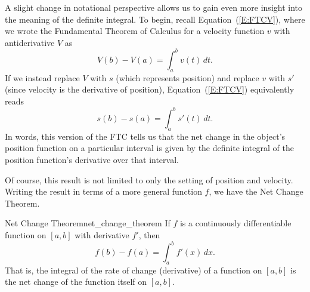 A slight change in notational perspective allows us to gain even more insight into the meaning of the definite integral.  To begin, recall Equation~(\ref{E:FTCV}), where we wrote the Fundamental Theorem of Calculus for a velocity function $v$ with antiderivative $V$ as
$$V(b) - V(a) = \int_a^b v(t) \, dt.$$
If we instead replace $V$ with $s$ (which represents position) and replace $v$ with $s'$ (since velocity is the derivative of position), Equation~(\ref{E:FTCV}) equivalently reads 
\begin{equation} \label{E:FTCs}
s(b) - s(a) = \int_a^b s'(t) \, dt.
\end{equation}
In words, this version of the FTC tells us that the net change in the object's position function on a particular interval is given by the definite integral of the position function's derivative over that interval.

Of course, this result is not limited to only the setting of position and velocity.  Writing the result in terms of a more general function $f$, we have the Net Change Theorem.

 \begin{theorem}{Net Change Theorem}{net_change_theorem}  If $f$ is a continuously differentiable function on $[a,b]$ with derivative $f'$, then 
 \begin{equation} \label{E:TotalChange}
f(b) - f(a) = \int_a^b f'(x) \, dx.
\end{equation}
That is, the  integral of the rate of change (derivative) of a function on $[a,b]$ is the net change of the function itself on $[a,b]$.
\end{theorem}


